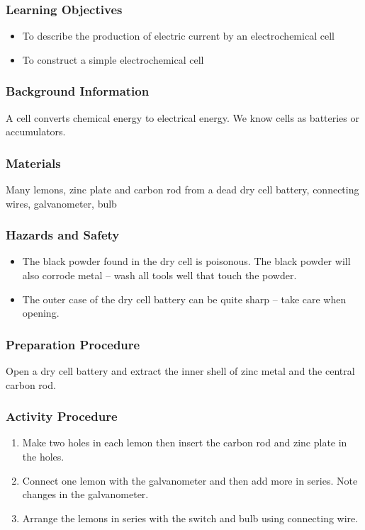 \subsubsection*{Learning Objectives}
\begin{itemize}
\item{To describe the production of electric current by an electrochemical cell}
\item{To construct a simple electrochemical cell}
\end{itemize}

\subsubsection*{Background Information}
A cell converts chemical energy to electrical energy.  We know cells as batteries or accumulators.

\subsubsection*{Materials}
Many lemons, zinc plate and carbon rod from a dead dry cell battery, connecting wires, galvanometer, bulb

\subsubsection*{Hazards and Safety}
\begin{itemize}
\item{The black powder found in the dry cell is poisonous. The black powder will also corrode metal -- wash all tools well that touch the powder.}
\item{The outer case of the dry cell battery can be quite sharp -- take care when opening.}
\end{itemize}

\subsubsection*{Preparation Procedure}
Open a dry cell battery and extract the inner shell of zinc metal and the central carbon rod.

\subsubsection*{Activity Procedure}
\begin{enumerate}
\item{Make two holes in each lemon then insert the carbon rod and zinc plate in the holes.} 
\item{Connect one lemon with the galvanometer and then add more in series. Note changes in the galvanometer.}
\item{Arrange the lemons in series with the switch and bulb using connecting wire.} 
\end{enumerate}

